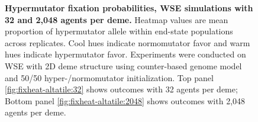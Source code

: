 \begin{figure}[h]
  \begin{minipage}{\linewidth}
    \caption{%
\textbf{Hypermutator fixation probabilities, WSE simulations with 32 and 2,048 agents per deme.}
\footnotesize
Heatmap values are mean proportion of hypermutator allele within end-state populations across replicates.
Cool hues indicate normomutator favor and warm hues indicate hypermutator favor.
Experiments were conducted on WSE with 2D deme structure using counter-based genome model and 50/50 hyper-/normomutator initialization.
Top panel \ref{fig:fixheat-altatile:32} shows outcomes with 32 agents per deme;
Bottom panel \ref{fig:fixheat-altatile:2048} shows outcomes with 2,048 agents per deme.
    }
    \label{fig:fixheat-wse}
  \end{minipage}
\end{figure}
